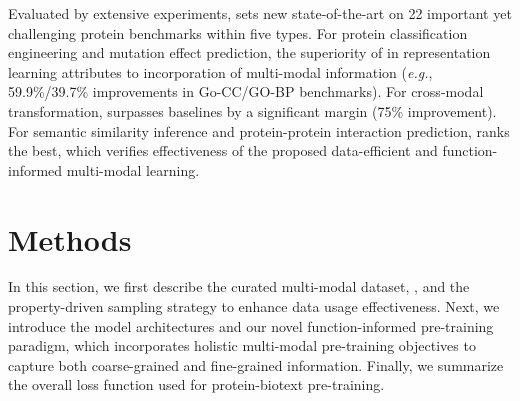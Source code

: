 Evaluated by extensive experiments, \ourapproach sets new state-of-the-art on 22 important yet challenging protein benchmarks within five types. For protein classification engineering and mutation effect prediction, the superiority of \ourapproach in representation learning attributes to incorporation of multi-modal information (\textit{e.g.}, 59.9\%/39.7\% improvements in Go-CC/GO-BP benchmarks). For cross-modal transformation, \ourapproach surpasses baselines by a significant margin (75\% improvement). 
For semantic similarity inference and protein-protein interaction prediction, \ourapproach ranks the best, which verifies effectiveness of the proposed data-efficient and function-informed multi-modal learning.

\section{Methods}
In this section, we first describe the curated multi-modal dataset, \ourdataset, and the property-driven sampling strategy to enhance data usage effectiveness. Next, we introduce the model architectures and our novel function-informed pre-training paradigm, which incorporates holistic multi-modal pre-training objectives to capture both coarse-grained and fine-grained information. Finally, we summarize the overall loss function used for protein-biotext pre-training.
\begin{table}[ht]
    \caption{Data distribution of \ourdatasetS and \ourdatasetD with different sample confidence. We highlight the confidence where protein entries are mostly concentrated in \textbf{bold}.}
    \vspace{-1em}
    \label{Tab:data_confidence}
    \begin{center}
    \vspace{-1em}
    \end{center}
\end{table}

